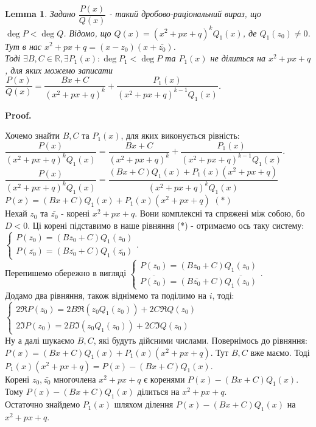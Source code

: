 \documentclass[a4paper, 10pt]{extarticle}
\makeatletter
\def\qed{$\blacksquare$}
\def\qed{$\blacksquare$}
\theoremstyle{theoremdd}
\theoremstyle{theoremdd}
\theoremstyle{theoremdd}
\theoremstyle{theoremdd}
\theoremstyle{theoremdd}
\theoremstyle{theoremdd}
\theoremstyle{theoremdd}
\newtheorem{lemma}[theorem]{Lemma}
\theoremstyle{theoremdd}
\renewenvironment{proof}[1][Proof.\\]{\par
\pushQED{\hfill \qed}%
\normalfont \topsep6\p@\@plus6\p@\relax
\trivlist
\item\relax
{\bfseries
#1\@addpunct{.}}\hspace\labelsep\ignorespaces
}{%
\popQED\endtrivlist\@endpefalse
}
\makeatother
\begin{document}
\begin{lemma}
Задано $\dfrac{P(x)}{Q(x)}$ - такий дробово-раціональний вираз, що $\deg P < \deg Q$. Відомо, що $Q(x) = (x^2+px+q)^kQ_1(x)$, де $Q_1(z_0) \neq 0$. Тут в нас $x^2+px+q = (x-z_0)(x+\bar{z_0})$.\\
Тоді $\exists B,C \in \mathbb{R}, \exists P_1(x): \deg P_1 < \deg P$ та $P_1(x)$ не ділиться на $x^2+px+q$, для яких можемо записати\\
$\dfrac{P(x)}{Q(x)} = \dfrac{Bx+C}{(x^2+px+q)^k} + \dfrac{P_1(x)}{(x^2+px+q)^{k-1}Q_1(x)}$.
\end{lemma}

\begin{proof}
Хочемо знайти $B,C$ та $P_1(x)$, для яких виконується рівність:\\
$\dfrac{P(x)}{(x^2+px+q)^k Q_1(x)} = \dfrac{Bx+C}{(x^2+px+q)^k} + \dfrac{P_1(x)}{(x^2+px+q)^{k-1}Q_1(x)}$.\\
$\dfrac{P(x)}{(x^2+px+q)^k Q_1(x)} = \dfrac{(Bx+C)Q_1(x)+P_1(x)(x^2+px+q)}{(x^2+px+q)^k Q_1(x)}$\\
$P(x) = (Bx+C)Q_1(x)+P_1(x)(x^2+px+q)$ $(*)$\\
Нехай $z_0$ та $\bar{z_0}$ - корені $x^2+px+q$. Вони комплексні та спряжені між собою, бо $D < 0$. Ці корені підставимо в наше рівняння (*) - отримаємо ось таку систему:
$\begin{cases} 
P(z_0) = (Bz_0+C)Q_1(z_0) \\
P(\bar{z_0}) = (B\bar{z_0}+C) Q_1(\bar{z_0})
\end{cases}$.\\
Перепишемо обережно в вигляді $\begin{cases} 
P(z_0) = (Bz_0+C)Q_1(z_0) \\
\overline{P(z_0)} = (B\bar{z_0}+C) \overline{Q_1(z_0)}
\end{cases}$.\\
Додамо два рівняння, також віднімемо та поділимо на $i$, тоді:\\
$\begin{cases}
2 \Re P(z_0) = 2B \Re (z_0 Q_1(z_0)) + 2C \Re Q(z_0) \\
2 \Im P(z_0) = 2B \Im(z_0 Q_1(z_0)) + 2C \Im Q(z_0)
\end{cases}
$\\
Ну а далі шукаємо $B,C$, які будуть дійсними числами. Повернімось до рівняння:\\
$P(x) = (Bx+C)Q_1(x) + P_1(x)(x^2+px+q)$. Тут $B,C$ вже маємо. Тоді\\
$P_1(x)(x^2+px+q) = P(x) - (Bx+C)Q_1(x)$.\\
Корені $z_0, \bar{z_0}$ многочлена $x^2+px+q$ є коренями $P(x)-(Bx+C)Q_1(x)$. Тому $P(x) - (Bx+C)Q_1(x)$ ділиться на $x^2+px+q$.\\
Остаточно знайдемо $P_1(x)$ шляхом ділення $P(x) - (Bx+C)Q_1(x)$ на $x^2+px+q$.
\end{proof}
\end{document}

